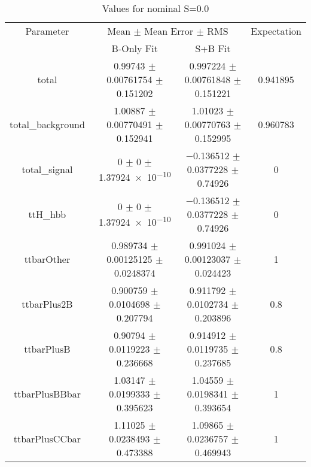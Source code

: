 \begin{table}
\centering
\caption{Values for nominal S=0.0}
\begin{tabular}{cccc}
\toprule
Parameter & \multicolumn{2}{c}{Mean $\pm$ Mean Error $\pm$ RMS} & Expectation\\
 & B-Only Fit & S+B Fit & \\
\midrule
total & \num{0.99743} $\pm$ \num{0.00761754} $\pm$ \num{0.151202} & \num{0.997224} $\pm$ \num{0.00761848} $\pm$ \num{0.151221} & \num{0.941895}\\
total\_background & \num{1.00887} $\pm$ \num{0.00770491} $\pm$ \num{0.152941} & \num{1.01023} $\pm$ \num{0.00770763} $\pm$ \num{0.152995} & \num{0.960783}\\
total\_signal & \num{0} $\pm$ \num{0} $\pm$ \num{1.37924e-10} & \num{-0.136512} $\pm$ \num{0.0377228} $\pm$ \num{0.74926} & \num{0}\\
ttH\_hbb & \num{0} $\pm$ \num{0} $\pm$ \num{1.37924e-10} & \num{-0.136512} $\pm$ \num{0.0377228} $\pm$ \num{0.74926} & \num{0}\\
ttbarOther & \num{0.989734} $\pm$ \num{0.00125125} $\pm$ \num{0.0248374} & \num{0.991024} $\pm$ \num{0.00123037} $\pm$ \num{0.024423} & \num{1}\\
ttbarPlus2B & \num{0.900759} $\pm$ \num{0.0104698} $\pm$ \num{0.207794} & \num{0.911792} $\pm$ \num{0.0102734} $\pm$ \num{0.203896} & \num{0.8}\\
ttbarPlusB & \num{0.90794} $\pm$ \num{0.0119223} $\pm$ \num{0.236668} & \num{0.914912} $\pm$ \num{0.0119735} $\pm$ \num{0.237685} & \num{0.8}\\
ttbarPlusBBbar & \num{1.03147} $\pm$ \num{0.0199333} $\pm$ \num{0.395623} & \num{1.04559} $\pm$ \num{0.0198341} $\pm$ \num{0.393654} & \num{1}\\
ttbarPlusCCbar & \num{1.11025} $\pm$ \num{0.0238493} $\pm$ \num{0.473388} & \num{1.09865} $\pm$ \num{0.0236757} $\pm$ \num{0.469943} & \num{1}\\
\bottomrule
\end{tabular}
\end{table}